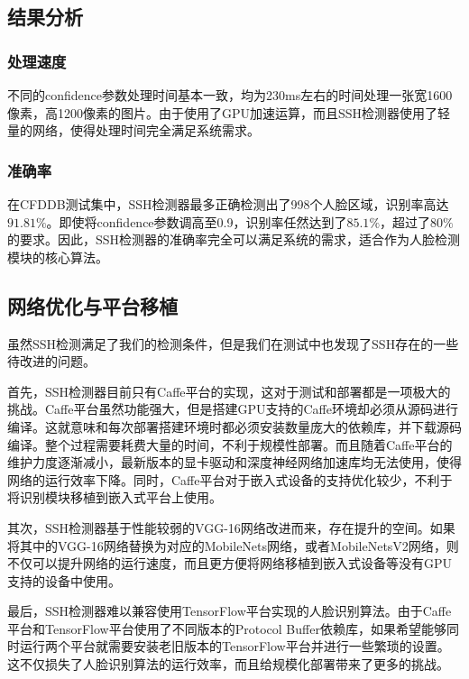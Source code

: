 \subsection{结果分析}

\subsubsection{处理速度}

不同的confidence参数处理时间基本一致，均为230ms左右的时间处理一张宽1600像素，高1200像素的图片。由于使用了GPU加速运算，而且SSH检测器使用了轻量的网络，使得处理时间完全满足系统需求。

\subsubsection{准确率}

在CFDDB测试集中，SSH检测器最多正确检测出了998个人脸区域，识别率高达$91.81\%$。即使将confidence参数调高至0.9，识别率任然达到了$85.1\%$，超过了$80\%$的要求。因此，SSH检测器的准确率完全可以满足系统的需求，适合作为人脸检测模块的核心算法。

\subsection{网络优化与平台移植}

虽然SSH检测满足了我们的检测条件，但是我们在测试中也发现了SSH存在的一些待改进的问题。

首先，SSH检测器目前只有Caffe平台的实现，这对于测试和部署都是一项极大的挑战。Caffe平台虽然功能强大，但是搭建GPU支持的Caffe环境却必须从源码进行编译。这就意味和每次部署搭建环境时都必须安装数量庞大的依赖库，并下载源码编译。整个过程需要耗费大量的时间，不利于规模性部署。而且随着Caffe平台的维护力度逐渐减小，最新版本的显卡驱动和深度神经网络加速库均无法使用，使得网络的运行效率下降。同时，Caffe平台对于嵌入式设备的支持优化较少，不利于将识别模块移植到嵌入式平台上使用。

其次，SSH检测器基于性能较弱的VGG-16网络\cite{simonyan2014very}改进而来，存在提升的空间。如果将其中的VGG-16网络替换为对应的MobileNets网络\cite{howard2017mobilenets}，或者MobileNetsV2网络\cite{sandler2018inverted}，则不仅可以提升网络的运行速度，而且更方便将网络移植到嵌入式设备等没有GPU支持的设备中使用。

最后，SSH检测器难以兼容使用TensorFlow平台实现的人脸识别算法。由于Caffe平台和TensorFlow平台使用了不同版本的Protocol Buffer依赖库，如果希望能够同时运行两个平台就需要安装老旧版本的TensorFlow平台并进行一些繁琐的设置。这不仅损失了人脸识别算法的运行效率，而且给规模化部署带来了更多的挑战。

